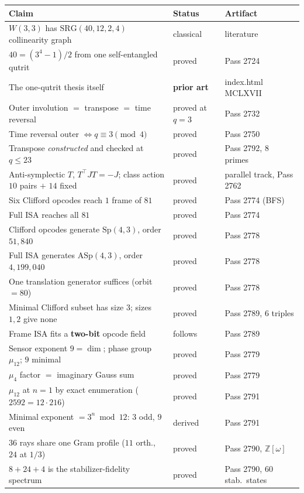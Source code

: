 \documentclass[11pt,a4paper]{article}
\newcommand{\cmd}[1]{{\ttfamily #1}}
\begin{document}
{\footnotesize
\begin{center}
\begin{tabular}{@{}p{8.4cm}p{2.4cm}p{3.9cm}@{}}
\toprule
\textbf{Claim} & \textbf{Status} & \textbf{Artifact}\\
\midrule
$W(3,3)$ has $\mathrm{SRG}(40,12,2,4)$ collinearity graph & classical & literature\\
$40=(3^4-1)/2$ from one self-entangled qutrit & proved & Pass 2724\\
The one-qutrit thesis itself & \textbf{prior art} & \cmd{index.html} MCLXVII\\
Outer involution $=$ transpose $=$ time reversal & proved at $q{=}3$ & Pass 2732\\
Time reversal outer $\iff q\equiv 3\pmod 4$ & proved & Pass 2750\\
Transpose \emph{constructed} and checked at $q\le 23$ & proved & Pass 2792, 8 primes\\
Anti-symplectic $T$, $T^\top JT=-J$; class action $10$ pairs $+$ $14$ fixed
   & proved & parallel track, Pass 2762\\
Six Clifford opcodes reach $1$ frame of $81$ & proved & Pass 2774 (BFS)\\
Full ISA reaches all $81$ & proved & Pass 2774\\
Clifford opcodes generate $\mathrm{Sp}(4,3)$, order $51{,}840$ & proved & Pass 2778\\
Full ISA generates $\mathrm{ASp}(4,3)$, order $4{,}199{,}040$ & proved & Pass 2778\\
One translation generator suffices (orbit $=80$) & proved & Pass 2778\\
Minimal Clifford subset has size $3$; sizes $1,2$ give none & proved & Pass 2789, 6 triples\\
Frame ISA fits a \textbf{two-bit} opcode field & follows & Pass 2789\\
Sensor exponent $9=\dim$; phase group $\mu_{12}$; $9$ minimal & proved & Pass 2779\\
$\mu_4$ factor $=$ imaginary Gauss sum & proved & Pass 2779\\
$\mu_{12}$ at $n{=}1$ by exact enumeration ($2592=12\cdot216$) & proved & Pass 2791\\
Minimal exponent $=3^n\bmod 12$: $3$ odd, $9$ even & derived & Pass 2791\\
$36$ rays share one Gram profile ($11$ orth., $24$ at $1/3$) & proved & Pass 2790, $\mathbb{Z}[\omega]$\\
$8{+}24{+}4$ is the stabilizer-fidelity spectrum & proved & Pass 2790, 60 stab.\ states\\

\end{tabular}
\end{center}}
\end{document}

